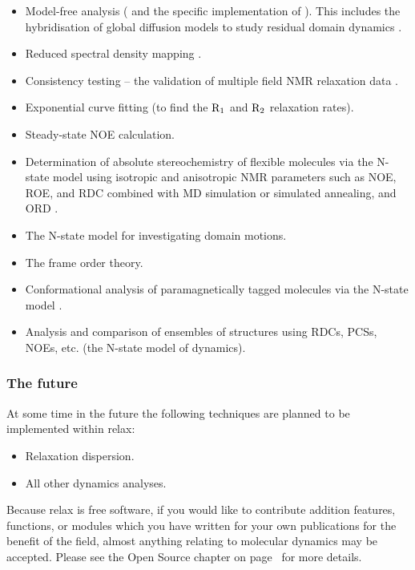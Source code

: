 \begin{itemize}
\item Model-free analysis (\citet{LipariSzabo82a, LipariSzabo82b, Clore90a} and the specific implementation of \citet{dAuvergneGooley03,dAuvergneGooley06,dAuvergneGooley07,dAuvergneGooley08a,dAuvergneGooley08b}).  This includes the hybridisation of global diffusion models to study residual domain dynamics \citep{Horne07}.
\item Reduced spectral density mapping \citep{Farrow95, Lefevre96}.
\item Consistency testing -- the validation of multiple field NMR relaxation data \citep{MorinGagne09a,Fushman99}.
\item Exponential curve fitting (to find the $\mathrm{R}_1$ and $\mathrm{R}_2$ relaxation rates).
\item Steady-state NOE calculation.
\item Determination of absolute stereochemistry of flexible molecules via the N-state model using isotropic and anisotropic NMR parameters such as NOE, ROE, and RDC combined with MD simulation or simulated annealing, and ORD \citep{Sun11}.
\item The N-state model for investigating domain motions.
\item The frame order theory.
\item Conformational analysis of paramagnetically tagged molecules via the N-state model \citep{Erdelyi11}.
\item Analysis and comparison of ensembles of structures using RDCs, PCSs, NOEs, etc. (the N-state model of dynamics).
\end{itemize}


\subsubsection{The future}

At some time in the future the following techniques are planned to be implemented within relax:

\begin{itemize}
\item Relaxation dispersion.
\item All other dynamics analyses.
\end{itemize}

Because relax is free software, if you would like to contribute addition features, functions, or modules which you have written for your own publications for the benefit of the field, almost anything relating to molecular dynamics may be accepted.  Please see the Open Source chapter on page~\pageref{ch: open source} for more details.



